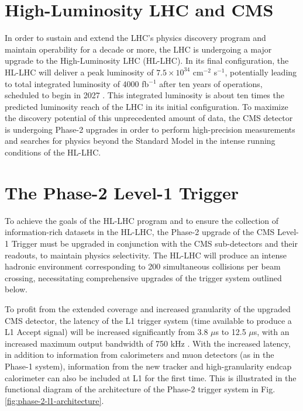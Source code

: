 \section{High-Luminosity LHC and CMS}
In order to sustain and extend the LHC's physics discovery program and maintain operability for a decade or more, the LHC is undergoing a major upgrade to the  High-Luminosity LHC (HL-LHC). In its final configuration, the HL-LHC will deliver a peak luminosity of $7.5 \times 10^{34}$ cm$^{-2}$ s$^{-1}$, potentially leading to total integrated luminosity of 4000 fb$^{-1}$ after ten years of operations, scheduled to begin in 2027 \cite{CMS-TDR-021}. This integrated luminosity is about ten times the predicted luminosity reach of the LHC in its initial configuration. To maximize the discovery potential of this unprecedented amount of data, the CMS detector is undergoing Phase-2 upgrades in order to perform high-precision measurements and searches for physics beyond the Standard Model in the intense running conditions of the HL-LHC.

\section{The Phase-2 Level-1 Trigger}
To achieve the goals of the HL-LHC program and to ensure the collection of information-rich datasets in the HL-LHC, the Phase-2 upgrade of the CMS Level-1 Trigger \cite{CMS-TDR-021} must be upgraded in conjunction with the CMS sub-detectors and their readouts, to maintain physics selectivity. The HL-LHC will produce an intense hadronic environment corresponding to 200 simultaneous collisions per beam crossing, necessitating comprehensive upgrades of the trigger system outlined below.

To profit from the extended coverage and increased granularity of the upgraded CMS detector, the latency of the L1 trigger system (time available to produce a L1 Accept signal) will be increased significantly from 3.8 $\mu$s to 12.5 $\mu$s, with an increased maximum output bandwidth of 750 kHz \cite{CMS-TDR-021}. With the increased latency, in addition to information from calorimeters and muon detectors (as in the Phase-1 system), information from the new tracker and high-granularity endcap calorimeter can also be included at L1 for the first time. This is illustrated in the functional diagram of the architecture of the Phase-2 trigger system in Fig. \ref{fig:phase-2-l1-architecture}. 

